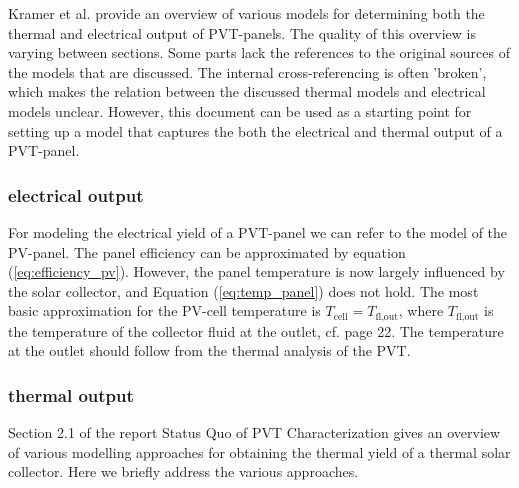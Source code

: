 Kramer et al. \cite{SHC2020PVT} provide an overview of various models for determining both the thermal and electrical output of PVT-panels. The quality of this overview is varying between sections. Some parts lack the references to the original sources of the models that are discussed. The internal cross-referencing is often 'broken', which makes the relation between the discussed thermal models and electrical models unclear. However, this document can be used as a starting point for setting up a model that captures the both the electrical and thermal output of a PVT-panel.

\subsubsection{electrical output}
For modeling the electrical yield of a PVT-panel we can refer to the model of the PV-panel. The panel efficiency can be approximated by equation (\ref{eq:efficiency_pv}). However, the panel temperature is now largely influenced by the solar collector, and Equation (\ref{eq:temp_panel}) does not hold. The most basic approximation for the PV-cell temperature is $T_{\text{cell}} = T_{\text{fl,out}}$, where $T_{\text{fl,out}} $ is the temperature of the collector fluid at the outlet, cf. \cite{SHC2020PVT} page 22. The temperature at the outlet should follow from the thermal analysis of the PVT.

\subsubsection{thermal output}
Section 2.1 of the report Status Quo of PVT Characterization \cite{SHC2020PVT} gives an overview of various modelling approaches for obtaining the thermal yield of a thermal solar collector.
Here we briefly address the various approaches.

